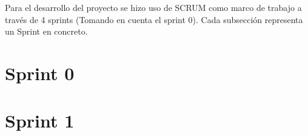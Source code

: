


Para el desarrollo del proyecto se hizo uso de SCRUM \cite{SCRUM} como marco de trabajo a través de 4 sprints \cite{SCRUM-Sprints} (Tomando en cuenta el sprint 0). Cada subsección representa un Sprint en concreto. 

\section{Sprint 0}

\section{Sprint 1}
